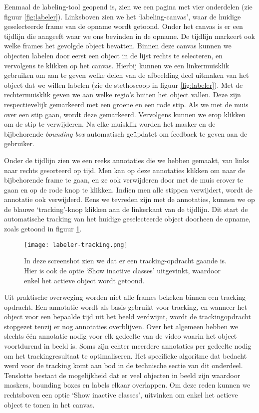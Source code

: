 Eenmaal de labeling-tool geopend is, zien we een pagina met vier onderdelen (zie figuur \ref{fig:labeler}).
Linksboven zien we het `labeling-canvas', waar de huidige geselecteerde frame van de opname wordt getoond. Onder het canvas is er een tijdlijn die aangeeft waar we ons bevinden in de opname. De tijdlijn markeert ook welke frames het gevolgde object bevatten. 
Binnen deze canvas kunnen we objecten labelen door eerst een object in de lijst rechts te selecteren, en vervolgens te klikken op het canvas.
Hierbij kunnen we een linkermuisklik gebruiken om aan te geven welke delen van de afbeelding deel uitmaken van het object dat we willen labelen (zie de stethoscoop in figuur \ref{fig:labeler}). Met de rechtermuisklik geven we aan welke regio's buiten het object vallen.
Deze zijn respectievelijk gemarkeerd met een groene en een rode stip. Als we met de muis over een stip gaan, wordt deze gemarkeerd. Vervolgens kunnen we erop klikken om de stip te verwijderen.
Na elke muisklik worden het masker en de bijbehorende \textit{bounding box} automatisch geüpdatet om feedback te geven aan de gebruiker.

Onder de tijdlijn zien we een reeks annotaties die we hebben gemaakt, van links naar rechts gesorteerd op tijd. Men kan op deze annotaties klikken om naar de bijbehorende frame te gaan, en ze ook verwijderen door met de muis erover te gaan en op de rode knop te klikken.
Indien men alle stippen verwijdert, wordt de annotatie ook verwijderd.
Eens we tevreden zijn met de annotaties, kunnen we op de blauwe `tracking'-knop klikken aan de linkerkant van de tijdlijn.
Dit start de automatische tracking van het huidige geselecteerde object doorheen de opname, zoals getoond in figuur \ref{fig:labeler-tracking}. 

\begin{figure}[H]
  \centering
  \texttt{[image: labeler-tracking.png]}
  \caption[]{\label{fig:labeler-tracking} In deze screenshot zien we dat er een tracking-opdracht gaande is. Hier is ook de optie `Show inactive classes' uitgevinkt, waardoor enkel het actieve object wordt getoond. }
\end{figure}

Uit praktische overweging worden niet alle frames bekeken binnen een tracking-opdracht. Een annotatie wordt als basis gebruikt voor tracking, en wanneer het object voor een bepaalde tijd uit het beeld verdwijnt, wordt de trackingopdracht stopgezet tenzij er nog annotaties overblijven.
Over het algemeen hebben we slechts één annotatie nodig voor elk gedeelte van de video waarin het object voortdurend in beeld is. Soms zijn echter meerdere annotaties per gedeelte nodig om het trackingresultaat te optimaliseren.
Het specifieke algoritme dat bedacht werd voor de tracking komt aan bod in de technische sectie van dit onderdeel.
Tenslotte bestaat de mogelijkheid dat er veel objecten in beeld zijn waardoor maskers, bounding boxes en labels elkaar overlappen. Om deze reden kunnen we rechtsboven een optie `Show inactive classes', uitvinken om enkel het actieve object te tonen in het canvas.

